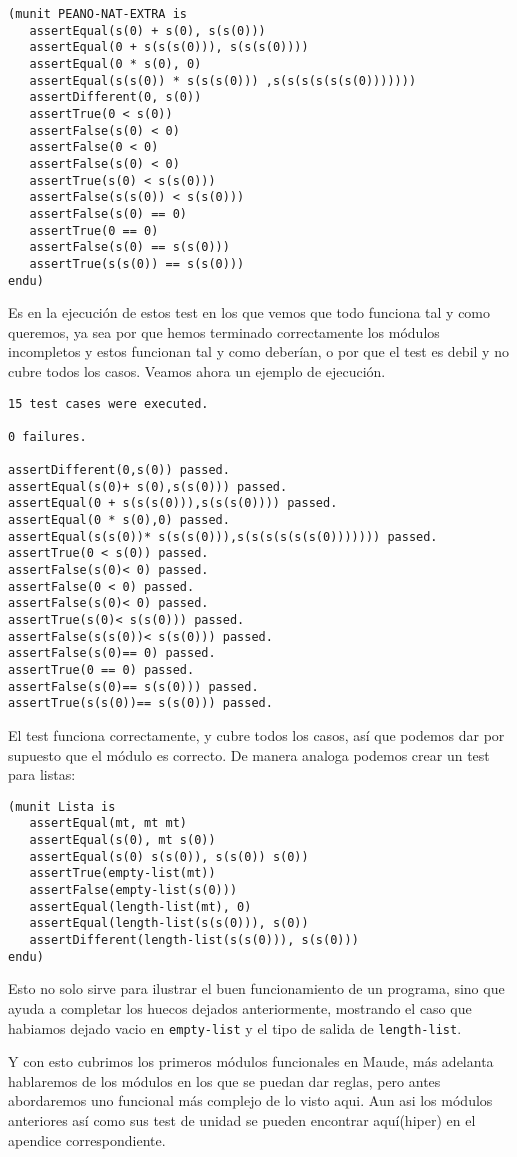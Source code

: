 {\codesize
\begin{verbatim}
(munit PEANO-NAT-EXTRA is
   assertEqual(s(0) + s(0), s(s(0)))
   assertEqual(0 + s(s(s(0))), s(s(s(0))))
   assertEqual(0 * s(0), 0)
   assertEqual(s(s(0)) * s(s(s(0))) ,s(s(s(s(s(s(0)))))))
   assertDifferent(0, s(0))
   assertTrue(0 < s(0))
   assertFalse(s(0) < 0)
   assertFalse(0 < 0)
   assertFalse(s(0) < 0)
   assertTrue(s(0) < s(s(0)))
   assertFalse(s(s(0)) < s(s(0)))
   assertFalse(s(0) == 0)
   assertTrue(0 == 0)
   assertFalse(s(0) == s(s(0)))
   assertTrue(s(s(0)) == s(s(0)))
endu)

\end{verbatim}
}

Es en la ejecución de estos test en los que vemos que todo funciona tal y como queremos, ya sea por que hemos terminado correctamente los módulos incompletos y estos funcionan tal y como deberían, o por que el test es debil y no cubre todos los casos. Veamos ahora un ejemplo de ejecución. \par

\begin{verbatim}
15 test cases were executed.

0 failures.

assertDifferent(0,s(0)) passed.
assertEqual(s(0)+ s(0),s(s(0))) passed.
assertEqual(0 + s(s(s(0))),s(s(s(0)))) passed.
assertEqual(0 * s(0),0) passed.
assertEqual(s(s(0))* s(s(s(0))),s(s(s(s(s(s(0))))))) passed.
assertTrue(0 < s(0)) passed.
assertFalse(s(0)< 0) passed.
assertFalse(0 < 0) passed.
assertFalse(s(0)< 0) passed.
assertTrue(s(0)< s(s(0))) passed.
assertFalse(s(s(0))< s(s(0))) passed.
assertFalse(s(0)== 0) passed.
assertTrue(0 == 0) passed.
assertFalse(s(0)== s(s(0))) passed.
assertTrue(s(s(0))== s(s(0))) passed.
\end{verbatim}

El test funciona correctamente, y cubre todos los casos, así que podemos dar por supuesto que el módulo es correcto. De manera analoga podemos crear un test para listas: \par

\begin{verbatim}
(munit Lista is
   assertEqual(mt, mt mt)
   assertEqual(s(0), mt s(0))
   assertEqual(s(0) s(s(0)), s(s(0)) s(0))
   assertTrue(empty-list(mt))
   assertFalse(empty-list(s(0)))
   assertEqual(length-list(mt), 0)
   assertEqual(length-list(s(s(0))), s(0))
   assertDifferent(length-list(s(s(0))), s(s(0)))
endu)
\end{verbatim}

Esto no solo sirve para ilustrar el buen funcionamiento de un programa, sino que ayuda a completar los huecos dejados anteriormente, mostrando el caso que habiamos dejado vacio en \texttt{empty-list} y el tipo de salida de \texttt{length-list}. \par

Y con esto cubrimos los primeros módulos funcionales en Maude, más adelanta hablaremos de los módulos en los que se puedan dar reglas, pero antes abordaremos uno funcional más complejo de lo visto aqui. Aun asi los módulos anteriores así como sus test de unidad se pueden encontrar aquí(hiper) en el apendice correspondiente.\par 


